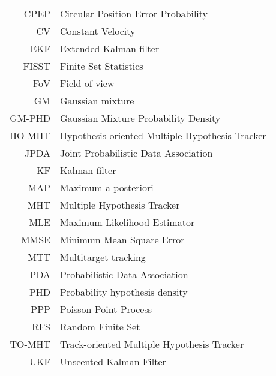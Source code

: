 \begin{tabular}{rl}
CPEP & Circular Position Error Probability \\
CV & Constant Velocity \\
EKF & Extended Kalman filter \\
FISST & Finite Set Statistics \\
FoV & Field of view \\
GM & Gaussian mixture \\
GM-PHD & Gaussian Mixture Probability Density \\
HO-MHT & Hypothesis-oriented Multiple Hypothesis Tracker \\
JPDA & Joint Probabilistic Data Association \\
KF & Kalman filter \\
MAP & Maximum a posteriori \\
MHT & Multiple Hypothesis Tracker \\
MLE & Maximum Likelihood Estimator \\
MMSE & Minimum Mean Square Error \\
MTT & Multitarget tracking \\
PDA & Probabilistic Data Association \\
PHD & Probability hypothesis density \\
PPP & Poisson Point Process \\
RFS & Random Finite Set \\
TO-MHT & Track-oriented Multiple Hypothesis Tracker \\
UKF & Unscented Kalman Filter \\
\end{tabular}
